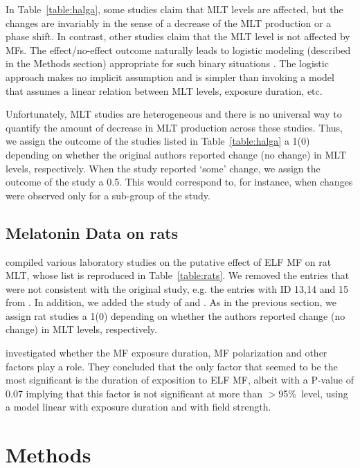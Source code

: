 \documentclass[a4]{article}
\begin{document}
In Table~\ref{table:halga}, some studies claim that MLT levels are affected, but the changes are invariably in the sense of a decrease of the MLT production or a phase shift.
In contrast, other studies claim that the MLT level is not affected by MFs.  The effect/no-effect outcome naturally leads to 
 logistic modeling (described in the Methods section) appropriate for such binary situations   \citep{Hosmer2000}. The logistic approach makes no implicit assumption and is simpler than invoking a model that assumes a linear relation between MLT levels, exposure duration, etc.

 Unfortunately, MLT studies are heterogeneous and there is no universal way to quantify the amount of decrease in MLT production across these studies. Thus,  we assign the outcome of the studies listed in Table~\ref{table:halga} a 1(0) depending on whether the original authors reported change (no change)  in MLT levels, respectively. When the study reported `some' change, we assign the outcome of the study a 0.5. This would correspond to, for instance, when changes were observed only for a sub-group of the study.


\subsection*{Melatonin Data on rats}
\label{section:rats}
 
\citet{Jahandideh2010} compiled various laboratory studies on the putative effect of ELF MF  on rat MLT,
whose list is reproduced in  Table~\ref{table:rats}. 
We  removed the entries that were not consistent with the original study, e.g. the entries with ID 13,14 and 15 from \citet{John1998}.
In addition, we added the study of \citet{Loscher1994} and \citet{Loscher1998}.
As in the previous section, we assign rat studies a 1(0) depending on whether the authors reported change (no change)  in  MLT levels, respectively.

\citet{Jahandideh2010} investigated whether the MF exposure duration, MF polarization and other factors play a role. They concluded that the only factor that seemed to be the most significant is the duration of exposition to ELF MF, albeit with a  P-value of 0.07 implying that this factor is not significant at more than $>$95\%\ level, using a model linear with exposure duration and with field strength.



\section*{Methods}
\end{document}
